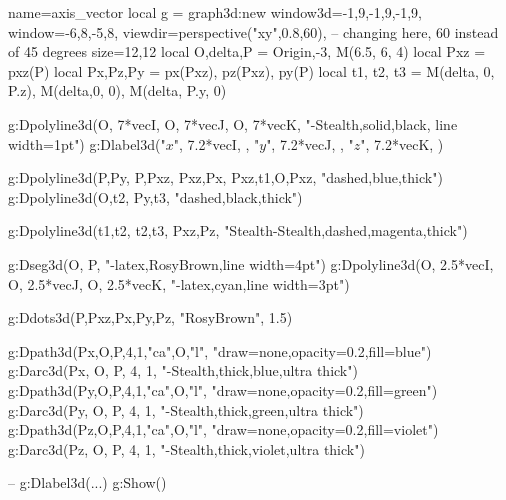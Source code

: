 \documentclass{standalone}
\begin{document}
\begin{luadraw}{name=axis_vector}
local g = graph3d:new{ 
    window3d={-1,9,-1,9,-1,9}, 
    window={-6,8,-5,8},
    viewdir=perspective("xy",0.8,60),  -- changing here, 60 instead of 45 degrees
    size={12,12} 
}
local O,delta,P = Origin,-3, M(6.5, 6, 4)
local Pxz = pxz(P)
local Px,Pz,Py = px(Pxz), pz(Pxz), py(P)
local t1, t2, t3 = M(delta, 0, P.z), M(delta,0, 0), M(delta, P.y, 0)

g:Dpolyline3d({{O, 7*vecI}, {O, 7*vecJ}, {O, 7*vecK}}, "-Stealth,solid,black, line width=1pt")
g:Dlabel3d("$x$", 7.2*vecI, {}, "$y$", 7.2*vecJ, {}, "$z$", 7.2*vecK, {})

g:Dpolyline3d({{P,Py}, {P,Pxz}, {Pxz,Px}, {Pxz,t1},{O,Pxz}}, "dashed,blue,thick")
g:Dpolyline3d({{O,t2}, {Py,t3}}, "dashed,black,thick")

g:Dpolyline3d({{t1,t2}, {t2,t3}, {Pxz,Pz}}, "Stealth-Stealth,dashed,magenta,thick")

g:Dseg3d({O, P}, "-latex,RosyBrown,line width=4pt")
g:Dpolyline3d({{O, 2.5*vecI}, {O, 2.5*vecJ}, {O, 2.5*vecK}}, "-latex,cyan,line width=3pt")

g:Ddots3d({P,Pxz,Px,Py,Pz}, "RosyBrown", 1.5)

g:Dpath3d({Px,O,P,4,1,"ca",O,"l"}, "draw=none,opacity=0.2,fill=blue")
g:Darc3d(Px, O, P, 4, 1, "-Stealth,thick,blue,ultra thick")
g:Dpath3d({Py,O,P,4,1,"ca",O,"l"}, "draw=none,opacity=0.2,fill=green")
g:Darc3d(Py, O, P, 4, 1, "-Stealth,thick,green,ultra thick")
g:Dpath3d({Pz,O,P,4,1,"ca",O,"l"}, "draw=none,opacity=0.2,fill=violet")
g:Darc3d(Pz, O, P, 4, 1, "-Stealth,thick,violet,ultra thick")

-- g:Dlabel3d(...)
g:Show()
\end{luadraw}
\end{document}
